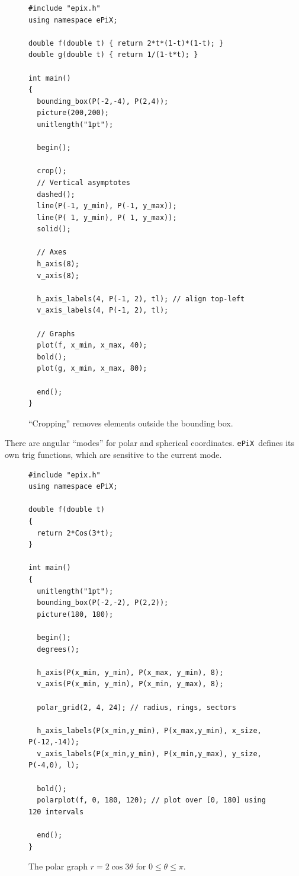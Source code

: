 \documentclass[11pt]{article}
\newcommand{\ePiX}{\texttt{ePiX}}
\begin{document}
\begin{figure}[hbt]
\begin{center}

\vspace*{-200pt}
\begin{small}
\begin{verbatim}
#include "epix.h"
using namespace ePiX;

double f(double t) { return 2*t*(1-t)*(1-t); }
double g(double t) { return 1/(1-t*t); }

int main() 
{
  bounding_box(P(-2,-4), P(2,4));
  picture(200,200);
  unitlength("1pt");

  begin();

  crop(); 
  // Vertical asymptotes
  dashed();
  line(P(-1, y_min), P(-1, y_max));
  line(P( 1, y_min), P( 1, y_max));
  solid();

  // Axes
  h_axis(8);
  v_axis(8);

  h_axis_labels(4, P(-1, 2), tl); // align top-left
  v_axis_labels(4, P(-1, 2), tl);

  // Graphs
  plot(f, x_min, x_max, 40);
  bold();
  plot(g, x_min, x_max, 80);

  end();
}

\end{verbatim}
\end{small}
\caption{``Cropping'' removes elements outside the bounding box.}
\label{fig:cropplot}
\end{center}
\end{figure}

\clearpage

\noindent There are angular ``modes'' for polar and spherical
coordinates. \ePiX\ defines its own trig functions, which are
sensitive to the current mode.

\begin{figure}[hbt]
\begin{center}

\vspace*{-150pt}
\begin{verbatim}
#include "epix.h"
using namespace ePiX;

double f(double t) 
{ 
  return 2*Cos(3*t); 
}

int main() 
{
  unitlength("1pt");
  bounding_box(P(-2,-2), P(2,2));
  picture(180, 180);

  begin();
  degrees();

  h_axis(P(x_min, y_min), P(x_max, y_min), 8);
  v_axis(P(x_min, y_min), P(x_min, y_max), 8);
  
  polar_grid(2, 4, 24); // radius, rings, sectors

  h_axis_labels(P(x_min,y_min), P(x_max,y_min), x_size, P(-12,-14));
  v_axis_labels(P(x_min,y_min), P(x_min,y_max), y_size, P(-4,0), l);

  bold();
  polarplot(f, 0, 180, 120); // plot over [0, 180] using 120 intervals

  end();
}

\end{verbatim}
\caption{The polar graph $r=2\cos 3\theta$ for $0\leq\theta\leq\pi$.}
\label{fig:polar}
\end{center}
\end{figure}
\end{document}
